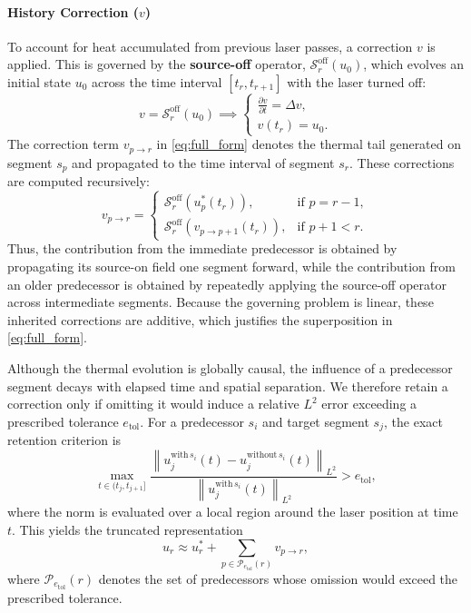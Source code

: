 \documentclass[conference]{IEEEtran}
\begin{document}
\paragraph{History Correction ($v$)} 
To account for heat accumulated from previous laser passes, a correction $v$ is applied. This is governed by the \textbf{source-off} operator, $\mathcal{S}^{\mathrm{off}}_r(u_0)$, which evolves an initial state $u_0$ across the time interval $[t_r,t_{r+1}]$ with the laser turned off:
\begin{equation}
v = \mathcal{S}^{\mathrm{off}}_r(u_0) \implies 
\begin{cases} 
\frac{\partial v}{\partial t} = \Delta v, \\
v(t_r) = u_0.
\end{cases}
\label{eq:source_off}
\end{equation}
The correction term $v_{p\to r}$ in \cref{eq:full_form} denotes the thermal tail generated on segment $s_p$ and propagated to the time interval of segment $s_r$. These corrections are computed recursively:
\begin{equation}
v_{p\to r} = 
\begin{cases} 
\mathcal{S}^{\mathrm{off}}_r\!\left(u_p^*(t_r)\right), & \text{if } p = r - 1, \\[0.5ex]
\mathcal{S}^{\mathrm{off}}_r\!\left(v_{p\to p+1}(t_r)\right), & \text{if } p+1 < r.
\end{cases}
\label{eq:correction_recursion}
\end{equation}
Thus, the contribution from the immediate predecessor is obtained by propagating its source-on field one segment forward, while the contribution from an older predecessor is obtained by repeatedly applying the source-off operator across intermediate segments. Because the governing problem is linear, these inherited corrections are additive, which justifies the superposition in \cref{eq:full_form}.


Although the thermal evolution is globally causal, the influence of a predecessor segment decays with elapsed time and spatial separation. We therefore retain a correction only if omitting it would induce a relative $L^2$ error exceeding a prescribed tolerance $e_{\mathrm{tol}}$. For a predecessor $s_i$ and target segment $s_j$, the exact retention criterion is
\begin{equation}
\max_{t \in (t_j,t_{j+1}]}
\frac{
\left\|u_j^{\mathrm{with}\,s_i}(t)-u_j^{\mathrm{without}\,s_i}(t)\right\|_{L^2}
}{
\left\|u_j^{\mathrm{with}\,s_i}(t)\right\|_{L^2}
}
> e_{\mathrm{tol}},
\label{eq:edge_criterion}
\end{equation}
where the norm is evaluated over a local region around the laser position at time $t$. This yields the truncated representation
\begin{equation}
u_r \approx u_r^* + \sum_{p \in \mathcal{P}_{e_{\mathrm{tol}}}(r)} v_{p\to r},
\label{eq:truncated_form}
\end{equation}
where $\mathcal{P}_{e_{\mathrm{tol}}}(r)$ denotes the set of predecessors whose omission would exceed the prescribed tolerance.
\end{document}
